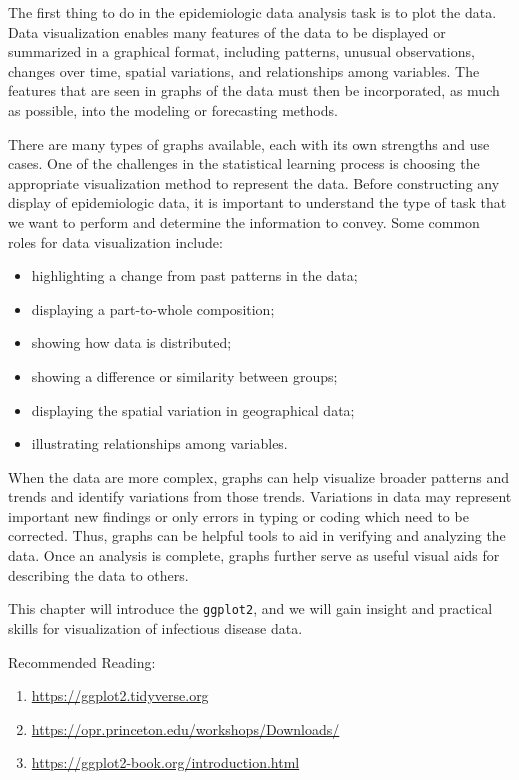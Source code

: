 \documentclass[]{book}
\providecommand{\tightlist}{%
  \setlength{\itemsep}{0pt}\setlength{\parskip}{0pt}}
\begin{document}
The first thing to do in the epidemiologic data analysis task is to plot
the data. Data visualization enables many features of the data to be
displayed or summarized in a graphical format, including patterns,
unusual observations, changes over time, spatial variations, and
relationships among variables. The features that are seen in graphs of
the data must then be incorporated, as much as possible, into the
modeling or forecasting methods.

There are many types of graphs available, each with its own strengths
and use cases. One of the challenges in the statistical learning process
is choosing the appropriate visualization method to represent the data.
Before constructing any display of epidemiologic data, it is important
to understand the type of task that we want to perform and determine the
information to convey. Some common roles for data visualization include:

\begin{itemize}
\tightlist
\item
  highlighting a change from past patterns in the data;
\item
  displaying a part-to-whole composition;
\item
  showing how data is distributed;
\item
  showing a difference or similarity between groups;
\item
  displaying the spatial variation in geographical data;
\item
  illustrating relationships among variables.
\end{itemize}

When the data are more complex, graphs can help visualize broader
patterns and trends and identify variations from those trends.
Variations in data may represent important new findings or only errors
in typing or coding which need to be corrected. Thus, graphs can be
helpful tools to aid in verifying and analyzing the data. Once an
analysis is complete, graphs further serve as useful visual aids for
describing the data to others.

This chapter will introduce the \texttt{ggplot2}, and we will gain
insight and practical skills for visualization of infectious disease
data.

Recommended Reading:

\begin{enumerate}
\def\labelenumi{\arabic{enumi}.}
\tightlist
\item
  \url{https://ggplot2.tidyverse.org}
\item
  \url{https://opr.princeton.edu/workshops/Downloads/}
\item
  \url{https://ggplot2-book.org/introduction.html}
\end{enumerate}
\end{document}
